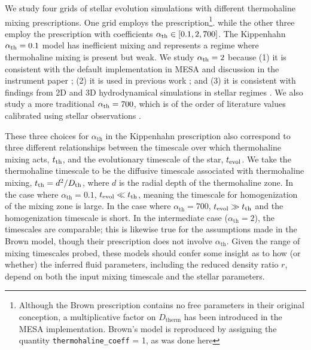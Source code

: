 We study four grids of stellar evolution simulations with different thermohaline mixing prescriptions. One grid employs the \citet{brown_etal_2013} prescription\footnote{Although the Brown prescription contains no free parameters in their original conception, a multiplicative factor on $D_{\text{therm}}$ has been introduced in the MESA implementation. Brown's model is reproduced by assigning the quantity \texttt{thermohaline\_coeff} = 1, as was done here}. 
%
while the other three employ the \citet{kippenhahn_etal_1980} prescription with coefficients $\alpha_{\rm th} \in [0.1, 2, 700]$. %
The Kippenhahn $\alpha_{\rm th} = 0.1$ model has inefficient mixing and represents a regime where thermohaline mixing is present but weak.
%
%
We study $\alpha_{\rm th} = 2$ because (1) it is consistent with the default implementation in MESA and discussion in the instrument paper \citep{mesa2}; (2) it is used in previous work \citep{CantielloLanger2010, TayarJoyce22}; and (3) it is consistent with findings from 2D and 3D hydrodynamical simulations in stellar regimes 
\citep{Denissenkov2010, traxler_etal_2011, brown_etal_2013}. We also study a more traditional $\alpha_{\rm th} = 700$, which is of the order of literature values calibrated 
using stellar observations \citep{lattanzio_etal_2015, charbonnel_thermohaline_2007}.

These three choices for $\alpha_{\text{th}}$ in the Kippenhahn prescription also correspond to three different relationships between the timescale over which thermohaline mixing acts, $t_{\rm th}$, and the evolutionary timescale of the star, $t_{\rm{evol}}$. 
We take the thermohaline timescale to be the diffusive timescale associated with thermohaline mixing, $t_{\rm th} = d^2/D_{\rm th}$, where $d$ is the radial depth of the thermohaline zone.
In the case where $\alpha_{\text{th}} = 0.1$, 
$t_{\rm evol} \ll t_{\rm th}$, meaning the timescale for homogenization of the mixing zone is large. In the case where $\alpha_{\text{th}} = 700$, 
$t_{\rm evol} \gg t_{\rm th}$ and the homogenization timescale is short. In the intermediate case ($\alpha_{\text{th}}= 2$), the timescales are comparable; this is likewise true for the assumptions made in the Brown model, though their prescription does not involve $\alpha_{\text{th}}$. 
%
Given the range of mixing timescales probed, these models should confer some insight as to how (or whether) the inferred fluid parameters, including the reduced density ratio $r$, depend on both the input mixing timescale and the stellar parameters.

